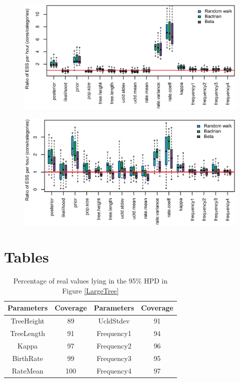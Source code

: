 \documentclass{bmcart}
\begin{document}
\begin{backmatter}
\begin{figure}[h!]
\includegraphics[width=12cm]{RSV2Proposal.eps}\\
\caption{}
\label{rsv2proposal}
\end{figure}

\begin{figure}[h!]
\includegraphics[width=12cm]{ShankarappaProposal.eps}\\
\caption{}
\label{shankarappaproposal}
\end{figure}

\clearpage
\section*{Tables}
\begin{table}[h!]
  \centering
\begin{tabular}{cc|cc}
\hline
Parameters&Coverage&Parameters&Coverage\\
\hline
TreeHeight&89&UcldStdev&91\\
TreeLength&91&Frequency1&94\\
Kappa&97&Frequency2&96\\
BirthRate&99&Frequency3&95\\
RateMean&100&Frequency4&97\\
\hline
\end{tabular}
\caption{Percentage of real values lying in the 95\% HPD in Figure \ref{LargeTree} }\label{num_hpd}
\end{table}


\end{backmatter}
\end{document}
